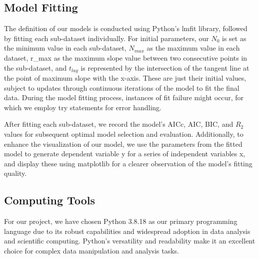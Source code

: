 \documentclass[11pt]{article}
\begin{document}
\begin{linenumbers}
        \subsection{Model Fitting}
        The definition of our models is conducted using Python's lmfit library, followed by fitting each sub-dataset individually. For initial parameters, our $N_0$ is set as the minimum value in each sub-dataset, $N_{max}$ as the maximum value in each dataset, r\_max as the maximum slope value between two consecutive points in the sub-dataset, and $t_{lag}$ is represented by the intersection of the tangent line at the point of maximum slope with the x-axis. These are just their initial values, subject to updates through continuous iterations of the model to fit the final data. During the model fitting process, instances of fit failure might occur, for which we employ try statements for error handling.

        After fitting each sub-dataset, we record the model's AICc, AIC, BIC, and $R_2$ values for subsequent optimal model selection and evaluation. Additionally, to enhance the visualization of our model, we use the parameters from the fitted model to generate dependent variable y for a series of independent variables x, and display these using matplotlib for a clearer observation of the model's fitting quality.
        
        
        \subsection{Computing Tools}
        For our project, we have chosen Python 3.8.18 as our primary programming language due to its robust capabilities and widespread adoption in data analysis and scientific computing. Python's versatility and readability make it an excellent choice for complex data manipulation and analysis tasks.


\end{linenumbers}
\end{document}
